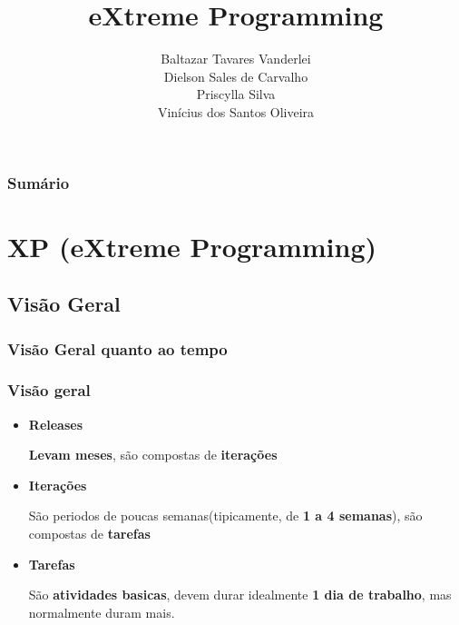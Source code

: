 \documentclass[10pt]{beamer}
\title[]{eXtreme Programming}
\author[]{Baltazar Tavares Vanderlei\\
Dielson Sales de Carvalho\\
Priscylla Silva\\
Vinícius dos Santos Oliveira}
\institute[2013]{Instituto de Computação - IC/UFAL}
\begin{document}
\newcommand{\til}{\~{}}

\frame{\titlepage}
\begin{frame}[t]
  \frametitle{Sumário}
  \tableofcontents[framebreaks]
\end{frame}




\section{XP (eXtreme Programming)}

\subsection{Visão Geral}

\begin{frame}
  \frametitle{Visão Geral quanto ao tempo}
  \begin{figure}
    \centering
  \end{figure}
\end{frame}


\begin{frame}
  \frametitle{Visão geral}
  \begin{itemize}%
  \item \textbf{Releases}
    \begin{block}{}
      \textbf{Levam meses}, são compostas de \textbf{iterações}
    \end{block}
  \item \textbf{Iterações}
    \begin{block}{}
      São periodos de poucas semanas(tipicamente, de \textbf{1 a 4 semanas}), são compostas de \textbf{tarefas}
    \end{block}
  \item \textbf{Tarefas}
    \begin{block}{}
      São \textbf{atividades basicas}, devem durar idealmente \textbf{1 dia de trabalho}, mas normalmente duram mais.
    \end{block}
  \end{itemize}
\end{frame}
\end{document}

